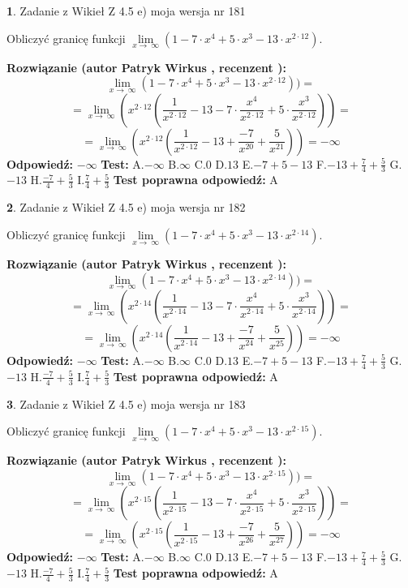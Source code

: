 \documentclass[12pt, a4paper]{article}
\theoremstyle{definition} %
\newtheorem{zad}{}
\newcommand{\zadStart}[1]{\begin{zad}#1\newline}
\newcommand{\zadStop}{\end{zad}}
\newcommand{\rozwStart}[2]{\noindent \textbf{Rozwiązanie (autor #1 , recenzent #2): }\newline}
\newcommand{\rozwStop}{\newline}
\newcommand{\odpStart}{\noindent \textbf{Odpowiedź:}\newline}
\newcommand{\odpStop}{\newline}
\newcommand{\testStart}{\noindent \textbf{Test:}\newline}
\newcommand{\testStop}{\newline}
\newcommand{\kluczStart}{\noindent \textbf{Test poprawna odpowiedź:}\newline}
\newcommand{\kluczStop}{\newline}
\begin{document}
\zadStart{Zadanie z Wikieł Z 4.5 e) moja wersja nr 181}



Obliczyć granicę funkcji  $\lim\limits_{x\to\ \infty}(1 - 7 \cdot x^{4}+5 \cdot x^{3}- 13 \cdot x^{2\cdot12})$.
\zadStop
\rozwStart{Patryk Wirkus}{}
$$\lim\limits_{x\to\ \infty}(1 - 7 \cdot x^{4}+5 \cdot x^{3}- 13 \cdot x^{2\cdot12}))=$$
$$=\lim\limits_{x\to\ \infty}(x^{2\cdot12}(\frac{1}{x^{2\cdot12}}-13 -7 \cdot \frac{x^{4}}{x^{2\cdot12}}+5 \cdot \frac{x^{3}}{x^{2\cdot12}}))=$$
$$=\lim\limits_{x\to\ \infty}(x^{2\cdot12}(\frac{1}{x^{2\cdot12}}-13 + \frac{-7}{x^{20}}+ \frac{5}{x^{21}}))=-\infty$$
\rozwStop
\odpStart
$-\infty$
\odpStop
\testStart
A.$-\infty$ B.$\infty$ C.$0$ D.$13$ E.$-7 + 5 - 13$
F.$-13+\frac{7}{4}+\frac{5}{3}$ G.$-13$
H.$\frac{-7}{4}+\frac{5}{3}$
I.$\frac{7}{4}+\frac{5}{3}$
\testStop
\kluczStart
A
\kluczStop



\zadStart{Zadanie z Wikieł Z 4.5 e) moja wersja nr 182}



Obliczyć granicę funkcji  $\lim\limits_{x\to\ \infty}(1 - 7 \cdot x^{4}+5 \cdot x^{3}- 13 \cdot x^{2\cdot14})$.
\zadStop
\rozwStart{Patryk Wirkus}{}
$$\lim\limits_{x\to\ \infty}(1 - 7 \cdot x^{4}+5 \cdot x^{3}- 13 \cdot x^{2\cdot14}))=$$
$$=\lim\limits_{x\to\ \infty}(x^{2\cdot14}(\frac{1}{x^{2\cdot14}}-13 -7 \cdot \frac{x^{4}}{x^{2\cdot14}}+5 \cdot \frac{x^{3}}{x^{2\cdot14}}))=$$
$$=\lim\limits_{x\to\ \infty}(x^{2\cdot14}(\frac{1}{x^{2\cdot14}}-13 + \frac{-7}{x^{24}}+ \frac{5}{x^{25}}))=-\infty$$
\rozwStop
\odpStart
$-\infty$
\odpStop
\testStart
A.$-\infty$ B.$\infty$ C.$0$ D.$13$ E.$-7 + 5 - 13$
F.$-13+\frac{7}{4}+\frac{5}{3}$ G.$-13$
H.$\frac{-7}{4}+\frac{5}{3}$
I.$\frac{7}{4}+\frac{5}{3}$
\testStop
\kluczStart
A
\kluczStop



\zadStart{Zadanie z Wikieł Z 4.5 e) moja wersja nr 183}



Obliczyć granicę funkcji  $\lim\limits_{x\to\ \infty}(1 - 7 \cdot x^{4}+5 \cdot x^{3}- 13 \cdot x^{2\cdot15})$.
\zadStop
\rozwStart{Patryk Wirkus}{}
$$\lim\limits_{x\to\ \infty}(1 - 7 \cdot x^{4}+5 \cdot x^{3}- 13 \cdot x^{2\cdot15}))=$$
$$=\lim\limits_{x\to\ \infty}(x^{2\cdot15}(\frac{1}{x^{2\cdot15}}-13 -7 \cdot \frac{x^{4}}{x^{2\cdot15}}+5 \cdot \frac{x^{3}}{x^{2\cdot15}}))=$$
$$=\lim\limits_{x\to\ \infty}(x^{2\cdot15}(\frac{1}{x^{2\cdot15}}-13 + \frac{-7}{x^{26}}+ \frac{5}{x^{27}}))=-\infty$$
\rozwStop
\odpStart
$-\infty$
\odpStop
\testStart
A.$-\infty$ B.$\infty$ C.$0$ D.$13$ E.$-7 + 5 - 13$
F.$-13+\frac{7}{4}+\frac{5}{3}$ G.$-13$
H.$\frac{-7}{4}+\frac{5}{3}$
I.$\frac{7}{4}+\frac{5}{3}$
\testStop
\kluczStart
A
\kluczStop
\end{document}
